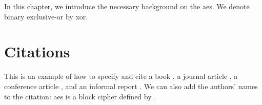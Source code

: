 In this chapter, we introduce the necessary background on the \gls{aes}.
We denote binary exclusive-or by \gls{xor}.

\section{Citations}
\label{sec:bib}
This is an example of how to specify and cite
a book \cite{AESbook},
a journal article \cite{bstjShannon49},
a conference article \cite{spKocherHFGGHHLM019},
and an informal report \cite{iacrSchneierFKR15}.
We can also add the authors' names to the citation:
\Gls{aes} is a block cipher defined by \textcite{AESbook}.
